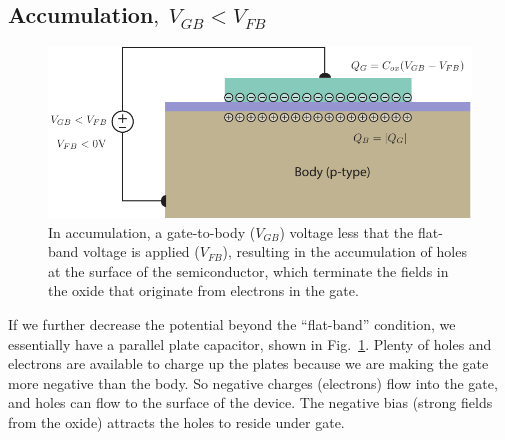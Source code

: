 \subsection{Accumulation\texorpdfstring{$,\;V_{GB}<V_{FB}$}{}}
\begin{figure}[tbh]
\centering
\includegraphics[width=.75\columnwidth]{mos_cap_acc}
\caption{In accumulation, a gate-to-body ($V_{GB}$) voltage less that the flat-band voltage is applied ($V_{FB}$), resulting in the accumulation of holes at the surface of the semiconductor, which terminate the fields in the oxide that originate from electrons in the gate.}
\label{fig:mos_accum}
\end{figure}
If we further decrease the potential beyond the “flat-band” condition, we essentially have a parallel plate capacitor, shown in Fig.~\ref{fig:mos_accum}.  Plenty of holes and electrons are available to charge up the plates because we are making the gate more negative than the body.  So negative charges (electrons) flow into the gate, and holes can flow to the surface of the device.  The negative bias (strong fields from the oxide) attracts the holes to reside under gate.
